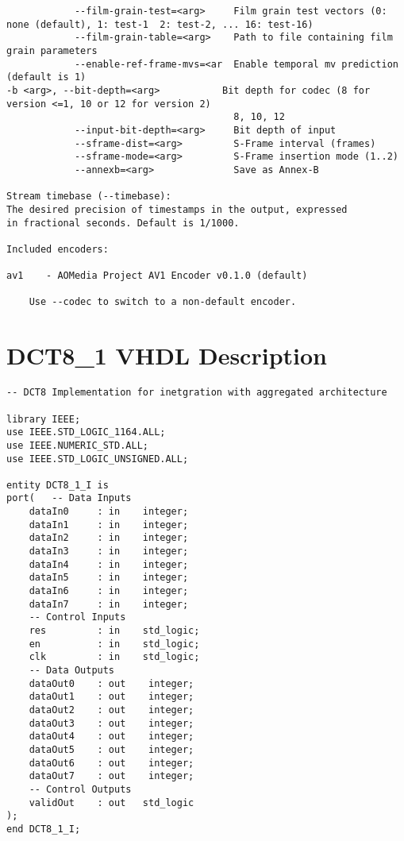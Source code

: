 \begin{appendices}
\begin{lstlisting}
            --film-grain-test=<arg>     Film grain test vectors (0: none (default), 1: test-1  2: test-2, ... 16: test-16)
            --film-grain-table=<arg>    Path to file containing film grain parameters
            --enable-ref-frame-mvs=<ar  Enable temporal mv prediction (default is 1)
-b <arg>, --bit-depth=<arg>           Bit depth for codec (8 for version <=1, 10 or 12 for version 2)
                                        8, 10, 12
            --input-bit-depth=<arg>     Bit depth of input
            --sframe-dist=<arg>         S-Frame interval (frames)
            --sframe-mode=<arg>         S-Frame insertion mode (1..2)
            --annexb=<arg>              Save as Annex-B

Stream timebase (--timebase):
The desired precision of timestamps in the output, expressed
in fractional seconds. Default is 1/1000.

Included encoders:

av1    - AOMedia Project AV1 Encoder v0.1.0 (default)

    Use --codec to switch to a non-default encoder.
\end{lstlisting}

\section{DCT8\_1 VHDL Description} \label{app:dct81}
\begin{lstlisting}[style=vhdl]
-- DCT8 Implementation for inetgration with aggregated architecture

library IEEE;
use IEEE.STD_LOGIC_1164.ALL;
use IEEE.NUMERIC_STD.ALL;
use IEEE.STD_LOGIC_UNSIGNED.ALL;

entity DCT8_1_I is
port(   -- Data Inputs
    dataIn0     : in    integer;
    dataIn1     : in    integer;
    dataIn2     : in    integer;
    dataIn3     : in    integer;
    dataIn4     : in    integer;
    dataIn5     : in    integer;
    dataIn6     : in    integer;
    dataIn7     : in    integer;
    -- Control Inputs
    res         : in    std_logic;
    en          : in    std_logic;
    clk         : in    std_logic;
    -- Data Outputs
    dataOut0    : out    integer;
    dataOut1    : out    integer;
    dataOut2    : out    integer;
    dataOut3    : out    integer;
    dataOut4    : out    integer;
    dataOut5    : out    integer;
    dataOut6    : out    integer;
    dataOut7    : out    integer;
    -- Control Outputs
    validOut    : out   std_logic
);
end DCT8_1_I;


\end{lstlisting}
\end{appendices}
